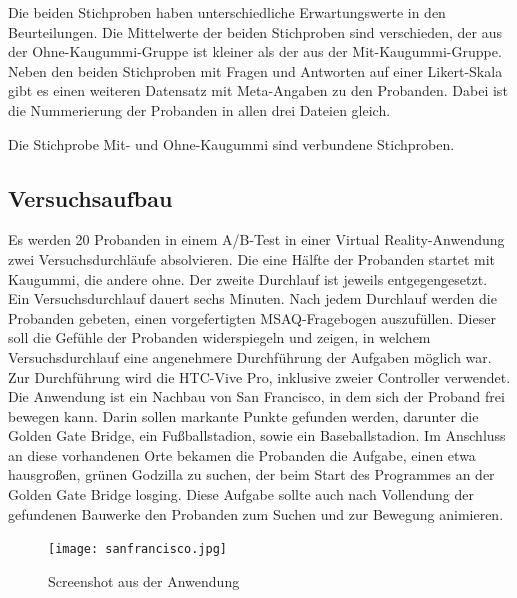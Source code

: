 \documentclass[conference]{IEEEtran}
\begin{document}
Die beiden Stichproben haben unterschiedliche Erwartungswerte in den Beurteilungen. Die Mittelwerte der beiden Stichproben sind verschieden, der aus der Ohne-Kaugummi-Gruppe ist kleiner als der aus der Mit-Kaugummi-Gruppe. Neben den beiden Stichproben mit Fragen und Antworten auf einer Likert-Skala gibt es einen weiteren Datensatz mit Meta-Angaben zu den Probanden. Dabei ist die Nummerierung der Probanden in allen drei Dateien gleich.

Die Stichprobe Mit- und Ohne-Kaugummi sind verbundene Stichproben.

\subsection{Versuchsaufbau}
Es werden 20 Probanden in einem A/B-Test in einer Virtual Reality-Anwendung zwei Versuchsdurchläufe absolvieren. Die eine Hälfte der Probanden startet mit Kaugummi, die andere ohne. Der zweite Durchlauf ist jeweils entgegengesetzt. Ein Versuchsdurchlauf dauert sechs Minuten. Nach jedem Durchlauf werden die Probanden gebeten, einen vorgefertigten MSAQ-Fragebogen auszufüllen. Dieser soll die Gefühle der Probanden widerspiegeln und zeigen, in welchem Versuchsdurchlauf eine angenehmere Durchführung der Aufgaben möglich war. Zur Durchführung wird die HTC-Vive Pro, inklusive zweier Controller verwendet. Die Anwendung ist ein Nachbau von San Francisco, in dem sich der Proband frei bewegen kann. Darin sollen markante Punkte gefunden werden, darunter die Golden Gate Bridge, ein Fußballstadion, sowie ein Baseballstadion. Im Anschluss an diese vorhandenen Orte bekamen die Probanden die Aufgabe, einen etwa hausgroßen, grünen Godzilla zu suchen, der beim Start des Programmes an der Golden Gate Bridge losging. Diese Aufgabe sollte auch nach Vollendung der gefundenen Bauwerke den Probanden zum Suchen und zur Bewegung animieren.

\begin{figure}
	\texttt{[image: sanfrancisco.jpg]}
	\caption{Screenshot aus der Anwendung}
	\label{img:screenshot}
\end{figure}
\end{document}
